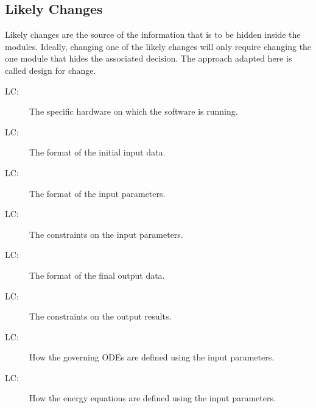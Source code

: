 \documentclass[12pt]{article}
\newcounter{lcnum}
\newcommand{\lcthelcnum}{LC\thelcnum}
\begin{document}
\subsection{Likely Changes}
\label{Sec:LikeChan}
Likely changes are the source of the information that is to be hidden inside the modules. Ideally, changing one of the likely changes will only require changing the one module that hides the associated decision. The approach adapted here is called design for change.
\begin{description}
\item[\lcthelcnum\label{LChardware}:]The specific hardware on which the software is running.
\end{description}
\begin{description}
\item[\lcthelcnum\label{LCinputformat}:]The format of the initial input data.
\end{description}
\begin{description}
\item[\lcthelcnum\label{LCparameters}:]The format of the input parameters.
\end{description}
\begin{description}
\item[\lcthelcnum\label{LCinputverification}:]The constraints on the input parameters.
\end{description}
\begin{description}
\item[\lcthelcnum\label{LCoutputformat}:]The format of the final output data.
\end{description}
\begin{description}
\item[\lcthelcnum\label{LCoutputverification}:]The constraints on the output results.
\end{description}
\begin{description}
\item[\lcthelcnum\label{LCtemp}:]How the governing ODEs are defined using the input parameters.
\end{description}
\begin{description}
\item[\lcthelcnum\label{LCenergy}:]How the energy equations are defined using the input parameters.
\end{description}
\end{document}

